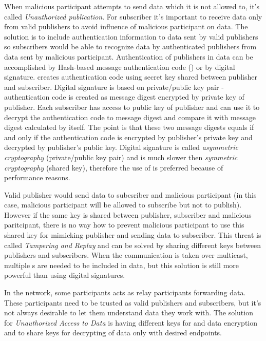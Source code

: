 When malicious participant attempts to send data which it is not allowed to, it's called {\em Unauthorized publication}. For subscriber it's important to receive data only from valid publishers to avoid influence of malicious participant on data. The solution is to include authentication information to data sent by valid publishers so subscribers would be able to recognize data by authenticated publishers from data sent by malicious participant. Authentication of publishers in data can be accomplished by Hash-based message authentication code () or by digital signature.  creates authentication code using secret key shared between publisher and subscriber. Digital signature is based on private/public key pair - authentication code is created as message digest encrypted by private key of publisher. Each subscriber has access to public key of publisher and can use it to decrypt the authentication code to message digest and compare it with message digest calculated by itself. The point is that these two message digests equals if and only if the authentication code is encrypted by publisher's private key and decrypted by publisher's public key. Digital signature is called {\em asymmetric cryptography} (private/public key pair) and is much slower then {\em symmetric cryptography} (shared key), therefore the use of  is preferred because of performance reasons.

Valid publisher would send data to subcsriber and malicious participant (in this case, malicious participant will be allowed to subscribe but not to publish). However if the same key is shared between publisher, subscriber and malicious paritcipant, there is no way how to prevent malicious participant to use this shared key for mimicking publisher and sending data to subscriber. This threat is called {\em Tampering and Replay} and can be solved by sharing different keys between publishers and subscribers. When the communication is taken over multicast, multiple s are needed to be included in data, but this solution is still more powerful than using digital signatures.

In the  network, some participants acts as relay participants forwarding data. These participants need to be trusted as valid publishers and subscribers, but it's not always desirable to let them understand data they work with. The solution for {\em Unauthorized Access to Data} is having different keys for  and data encryption and to share keys for decrypting of data only with desired endpoints.

